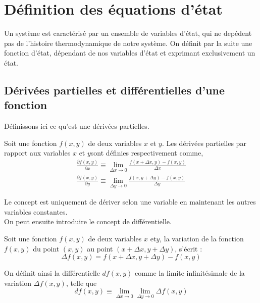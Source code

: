 \chapter{Définition des équations d'état}
 Un système est caractérisé par un ensemble de variables d'état, qui ne depédent pas de l'histoire thermodynamique de notre système. On définit par la suite une fonction d'état, dépendant de nos variables d'état et exprimant exclusivement un état.

\section{Dérivées partielles et différentielles d'une fonction}

Définissons ici ce qu'est une dérivées partielles.\\

\begin{definition}
Soit une fonction $f(x,y)$ de deux variables $x$ et $y$. Les dérivées partielles par rapport aux variables $x$ et $y$sont définies respectivement comme,
\begin{eqnarray}
\frac{\partial f(x,y)}{\partial x}\equiv \lim_{\Delta x \rightarrow0}\frac{f(x+\Delta x, y)-f(x,y)}{\Delta x}\\
\frac{\partial f(x,y)}{\partial y}\equiv \lim_{\Delta y \rightarrow0}\frac{f(x, y+ \Delta y)-f(x,y)}{\Delta y}
\end{eqnarray}
\end{definition}

Le concept est uniquement de dériver selon une variable en maintenant les autres variables constantes.\\

On peut ensuite introduire le concept de différentielle. \\

\begin{definition}[Différentielle]
Soit une fonction $f(x,y)$ de deux variables $x$ et$y$, la variation de la fonction $f(x,y)$ du point $(x,y)$ au point $(x+\Delta x, y+\Delta y)$, s'écrit :
 \begin{equation}
\Delta f(x,y)=f(x+\Delta x, y + \Delta y)-f(x,y)
\end{equation}
\end{definition}

On définit ainsi la différentielle $df(x,y)$ comme la limite infinitésimale de la variation $\Delta f(x,y)$, telle que
\begin{equation}
df(x,y)\equiv \lim_{\Delta x\rightarrow0} \lim_{\Delta y \rightarrow 0} \Delta f(x,y)
\end{equation}

